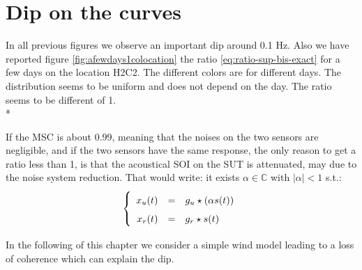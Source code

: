 \section{Dip on the curves}
In all previous figures we observe an important dip around 0.1 Hz.  Also we have reported figure \ref{fig:afewdays1colocation} the ratio \eqref{eq:ratio-sup-bis-exact} for a few days on the location H2C2. The different colors are for different days. The distribution seems to be uniform and does not depend on the day. The ratio seems to be different of 1.\\*

If the MSC is about 0.99, meaning that	 the noises on the two sensors are negligible, and if the two sensors have the same response, the only reason to get a ratio less than 1, is that the acoustical SOI on the SUT is attenuated, may due to the noise system reduction. That would write: it exists $\alpha\in\mathbb{C}$ with $|\alpha|<1$ s.t.:
\begin{eqnarray}
\label{eq:model-of-obervation}
\left\{
\renewcommand\arraystretch{1.6}
\begin{array}{rcl}
x_{\ut}(t)&=&g_{\ut}  \star (\alpha s(t))
\\
x_{\rf}(t)&=&g_{\rf}  \star s(t)
\end{array}
\right.
\end{eqnarray}


In the following of this chapter we consider a simple wind model leading to a loss of coherence which can explain the dip. 

%
%



